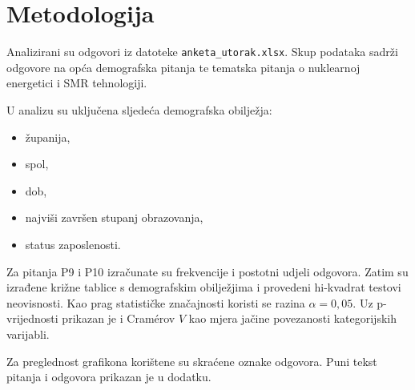\section{Metodologija}

Analizirani su odgovori iz datoteke \texttt{anketa\_utorak.xlsx}. Skup podataka sadrži odgovore na opća demografska pitanja te tematska pitanja o nuklearnoj energetici i SMR tehnologiji.

U analizu su uključena sljedeća demografska obilježja:

\begin{itemize}[nosep]
  \item županija,
  \item spol,
  \item dob,
  \item najviši završen stupanj obrazovanja,
  \item status zaposlenosti.
\end{itemize}

Za pitanja P9 i P10 izračunate su frekvencije i postotni udjeli odgovora. Zatim su izrađene križne tablice s demografskim obilježjima i provedeni hi-kvadrat testovi neovisnosti. Kao prag statističke značajnosti koristi se razina \(\alpha = 0{,}05\). Uz p-vrijednosti prikazan je i Cramérov \(V\) kao mjera jačine povezanosti kategorijskih varijabli.

Za preglednost grafikona korištene su skraćene oznake odgovora. Puni tekst pitanja i odgovora prikazan je u dodatku.
